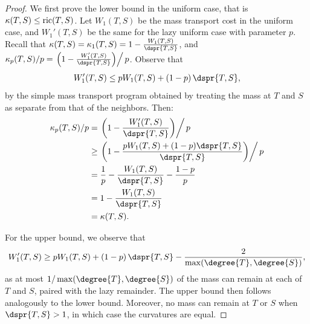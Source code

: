 \documentclass[11pt,onecolumn,conference]{IEEEtran}
\newcommand{\curvature}[2][]{%
    \ifthenelse{\equal{#1}{}}%
		{\kappa(#2)}%
		{\kappa_{#1}(#2)}%
}
\newcommand{\ric}[1]{
	\operatorname{ric}(#1)%
}
\begin{document}
\asymptotic*
\begin{proof}
	We first prove the lower bound in the uniform case, that is $\curvature{T,S} \le \ric{T,S}$.
	Let $W_1(T,S)$ be the mass transport cost in the uniform case, and $W_1'(T,S)$ be the same for the lazy uniform case with parameter $p$.
	Recall that $\curvature{T,S} = \curvature[1]{T,S} = 1 - \frac{W_1(T,S)}{\dspr{T,S}}$, and $\curvature[p]{T,S} / p = \left. \left(1 - \frac{W_1'(T,S)}{\dspr{T,S}}\right) \right/ p$.
	Observe that $$W_1'(T,S) \le pW_1(T,S) + (1-p) \, \dspr{T,S},$$ by the simple mass transport program obtained by treating the mass at $T$ and $S$ as separate from that of the neighbors.
	Then:
	\begin{align*}
		\curvature[p]{T,S} /p &= \left. \left(1 - \frac{W_1'(T,S)}{\dspr{T,S}}\right) \right/ p \\
		&\ge \left. \left(1 - \frac{pW_1(T,S) + (1-p)\dspr{T,S}}{\dspr{T,S}}\right) \right/ p \\
		&= \frac{1}{p} - \frac{W_1(T,S)}{\dspr{T,S}} - \frac{1-p}{p} \\
		&= 1 - \frac{W_1(T,S)}{\dspr{T,S}} \\
		&= \curvature{T,S}.
	\end{align*}

	For the upper bound, we observe that $$W_1'(T,S) \ge p W_1(T,S) + (1-p) \, \dspr{T,S} - \frac{2}{\max(\degree{T}, \degree{S})},$$ as at most $1 / \max(\degree{T},\degree{S})$ of the mass can remain at each of $T$ and $S$, paired with the lazy remainder.
	The upper bound then follows analogously to the lower bound.
	Moreover, no mass can remain at $T$ or $S$ when $\dspr{T,S} > 1$, in which case the curvatures are equal.
\end{proof}
\end{document}
